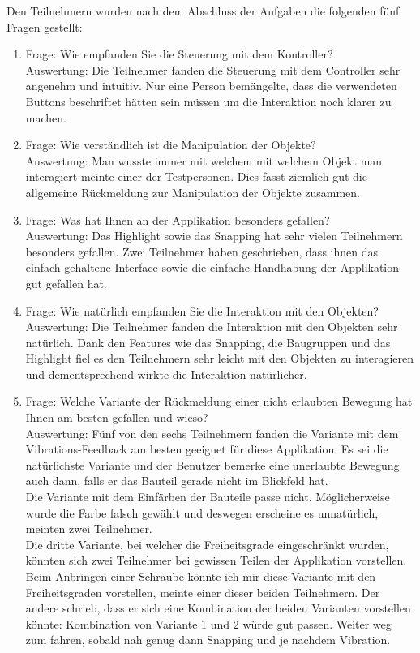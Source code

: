 \noindent Den Teilnehmern wurden nach dem Abschluss der Aufgaben die folgenden fünf Fragen gestellt:

\begin{enumerate} [itemsep=2pt]
	\item Frage: Wie empfanden Sie die Steuerung mit dem Kontroller? \\
	Auswertung: Die Teilnehmer fanden die Steuerung mit dem Controller sehr angenehm und intuitiv. Nur eine Person bemängelte, dass die verwendeten Buttons beschriftet hätten sein müssen um die Interaktion noch klarer zu machen.
	
	\item Frage: Wie verständlich ist die Manipulation der Objekte? \\
	Auswertung: \grqq Man wusste immer mit welchem mit welchem Objekt man interagiert\grqq {} meinte einer der Testpersonen. Dies fasst ziemlich gut die allgemeine Rückmeldung zur Manipulation der Objekte zusammen.
	
	\item Frage: Was hat Ihnen an der Applikation besonders gefallen? \\
	Auswertung: Das Highlight sowie das Snapping hat sehr vielen Teilnehmern besonders gefallen. Zwei Teilnehmer haben geschrieben, dass ihnen das einfach gehaltene Interface sowie die einfache Handhabung der Applikation gut gefallen hat.
	
	\item Frage: Wie natürlich empfanden Sie die Interaktion mit den Objekten? \\
	Auswertung: Die Teilnehmer fanden die Interaktion mit den Objekten sehr natürlich. Dank den Features wie das Snapping, die Baugruppen und das Highlight fiel es den Teilnehmern sehr leicht mit den Objekten zu interagieren und dementsprechend wirkte die Interaktion natürlicher.
	
	\item Frage: Welche Variante der Rückmeldung einer nicht erlaubten Bewegung hat Ihnen am besten gefallen und wieso? \\
	Auswertung: Fünf von den sechs Teilnehmern fanden die Variante mit dem Vibrations-Feedback am besten geeignet für diese Applikation. Es sei die natürlichste Variante und der Benutzer bemerke eine unerlaubte Bewegung auch dann, falls er das Bauteil gerade nicht im Blickfeld hat. \\
	Die Variante mit dem Einfärben der Bauteile passe nicht. Möglicherweise wurde die Farbe falsch gewählt und deswegen erscheine es unnatürlich, meinten zwei Teilnehmer. \\
	Die dritte Variante, bei welcher die Freiheitsgrade eingeschränkt wurden, könnten sich zwei Teilnehmer bei gewissen Teilen der Applikation vorstellen. \grqq Beim Anbringen einer Schraube könnte ich mir diese Variante mit den Freiheitsgraden vorstellen\grqq{}, meinte einer dieser beiden Teilnehmern. Der andere schrieb, dass er sich eine Kombination der beiden Varianten vorstellen könnte: \grqq Kombination von Variante 1 und 2 würde gut passen. Weiter weg zum fahren, sobald nah genug dann Snapping und je nachdem Vibration.\grqq{}
\end{enumerate}

